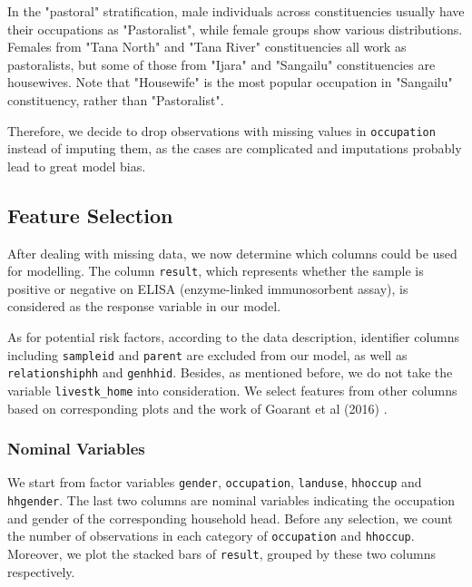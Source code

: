 \documentclass[11pt,twoside]{article}
\numberwithin{Theorem}{section}
\numberwithin{Definition}{section}
\numberwithin{Lemma}{section}
\numberwithin{Algorithm}{section}
\numberwithin{equation}{section}
\begin{document}
In the "pastoral" stratification, male individuals across constituencies usually have their occupations as "Pastoralist", while female groups show various distributions. Females from "Tana North" and "Tana River" constituencies all work as pastoralists, but some of those from "Ijara" and "Sangailu" constituencies are housewives. Note that "Housewife" is the most popular occupation in "Sangailu" constituency, rather than "Pastoralist".

Therefore, we decide to drop observations with missing values in \texttt{occupation} instead of imputing them, as the cases are complicated and imputations probably lead to great model bias. 

\subsection{Feature Selection}

After dealing with missing data, we now determine which columns could be used for modelling. The column \texttt{result}, which represents whether the sample is positive or negative on ELISA (enzyme-linked immunosorbent assay), is considered as the response variable in our model. 

As for potential risk factors, according to the data description, identifier columns including \texttt{sampleid} and \texttt{parent} are excluded from our model, as well as \texttt{relationshiphh} and \texttt{genhhid}. Besides, as mentioned before, we do not take the variable \texttt{livestk\_home} into consideration. We select features from other columns based on corresponding plots and the work of Goarant et al (2016) \cite{goarant2016leptospirosis}. 

\subsubsection{Nominal Variables}

We start from factor variables \texttt{gender}, \texttt{occupation}, \texttt{landuse}, \texttt{hhoccup} and \texttt{hhgender}. The last two columns are nominal variables indicating the occupation and gender of the corresponding household head. Before any selection, we count the number of observations in each category of \texttt{occupation} and \texttt{hhoccup}. Moreover, we plot the stacked bars of \texttt{result}, grouped by these two columns respectively.
\end{document}
